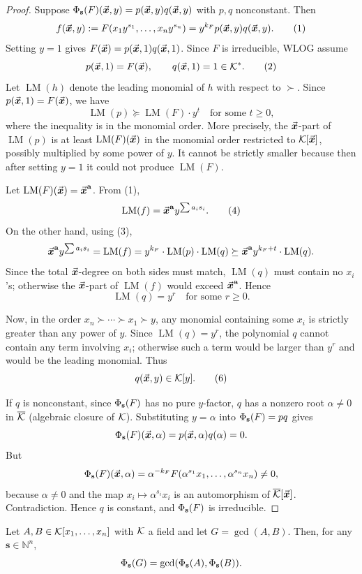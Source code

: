 \documentclass{article}
\numberwithin{equation}{section}
\begin{document}
\begin{proof}
Suppose $\Phi_{\mathbf{s}}(F)(\vec{\boldsymbol{x}},y)=p(\vec{\boldsymbol{x}},y)q(\vec{\boldsymbol{x}},y)$ with $p,q$ nonconstant. Then
\[
f(\vec{\boldsymbol{x}},y):=F(x_1y^{s_1},\dots,x_ny^{s_n})=y^{k_F}p(\vec{\boldsymbol{x}},y)q(\vec{\boldsymbol{x}},y). \tag{1}
\]
Setting $y=1$ gives $F(\vec{\boldsymbol{x}})=p(\vec{\boldsymbol{x}},1)q(\vec{\boldsymbol{x}},1)$. Since $F$ is irreducible, WLOG assume
\[
p(\vec{\boldsymbol{x}},1)=F(\vec{\boldsymbol{x}}), \qquad q(\vec{\boldsymbol{x}},1)=1\in{\mathcal{K}}^*. \tag{2}
\]
%
Let $\operatorname{LM}(h)$ denote the leading monomial of $h$ with respect to $\succ$.
%
Since $p(\vec{\boldsymbol{x}},1)=F(\vec{\boldsymbol{x}})$, we have
\[
\operatorname{LM}(p) \succeq \operatorname{LM}(F) \cdot y^t \quad \text{for some } t\ge 0, \tag{3}
\]
where the inequality is in the monomial order. More precisely, the $\vec{\boldsymbol{x}}$-part of $\operatorname{LM}(p)$ is at least $\operatorname{LM}(F)(\vec{\boldsymbol{x}})$ in the monomial order restricted to ${\mathcal{K}}[\vec{\boldsymbol{x}}]$, possibly multiplied by some power of $y$.  It cannot be strictly smaller because then after setting $y=1$ it could not produce $\operatorname{LM}(F)$.

Let $\operatorname{LM}(F)(\vec{\boldsymbol{x}})=\vec{\boldsymbol{x}}^{\mathbf{a}}$. From (1),
\[
\operatorname{LM}(f)=\vec{\boldsymbol{x}}^{\mathbf{a}} y^{\sum a_i s_i}. \tag{4}
\]
On the other hand, using (3),
\[
\vec{\boldsymbol{x}}^{\mathbf{a}} y^{\sum a_i s_i}=\operatorname{LM}(f)
= y^{k_F}\cdot \operatorname{LM}(p)\cdot \operatorname{LM}(q)
\succeq \vec{\boldsymbol{x}}^{\mathbf{a}} y^{k_F+t}\cdot \operatorname{LM}(q).
\]
Since the total $\vec{\boldsymbol{x}}$-degree on both sides must match, $\operatorname{LM}(q)$ must contain no $x_i$'s; otherwise the $\vec{\boldsymbol{x}}$-part of $\operatorname{LM}(f)$ would exceed $\vec{\boldsymbol{x}}^{\mathbf{a}}$. Hence
\[
\operatorname{LM}(q)=y^r \quad \text{for some } r\ge 0. \tag{5}
\]

Now, in the order $x_n \succ \cdots \succ x_1 \succ y$, any monomial containing some $x_i$ is strictly greater than any power of $y$. Since $\operatorname{LM}(q)=y^r$, the polynomial $q$ cannot contain any term involving $x_i$; otherwise such a term would be larger than $y^r$ and would be the leading monomial. Thus
\[
q(\vec{\boldsymbol{x}},y)\in{\mathcal{K}}[y]. \tag{6}
\]

If $q$ is nonconstant, since $\Phi_{\mathbf{s}}(F)$ has no pure $y$-factor, $q$ has a nonzero root $\alpha \neq 0$ in $\overline{{\mathcal{K}}}$ (algebraic closure of ${\mathcal{K}}$). Substituting $y=\alpha$ into $\Phi_{\mathbf{s}}(F)=pq$ gives
\[
\Phi_{\mathbf{s}}(F)(\vec{\boldsymbol{x}},\alpha)=p(\vec{\boldsymbol{x}},\alpha)q(\alpha)=0.
\]
But
\[
\Phi_{\mathbf{s}}(F)(\vec{\boldsymbol{x}},\alpha)=\alpha^{-k_F}F(\alpha^{s_1}x_1,\dots,\alpha^{s_n}x_n)\neq 0,
\]
because $\alpha\neq 0$ and the map $x_i\mapsto \alpha^{s_i}x_i$ is an automorphism of $\overline{{\mathcal{K}}}[\vec{\boldsymbol{x}}]$. Contradiction. Hence $q$ is constant, and $\Phi_{\mathbf{s}}(F)$ is irreducible.
\end{proof}

\begin{lemma}\label{lem:gcd-separation}
Let $A, B \in {\mathcal{K}}[x_1,\dots,x_n]$ with ${\mathcal{K}}$ a field and let $G = \gcd(A, B)$. Then, for any $\mathbf{s} \in \mathbb{N}^n$,
\[
\Phi_{\mathbf{s}}(G) =  \gcd(\Phi_{\mathbf{s}}(A), \Phi_{\mathbf{s}}(B)).
\]
\end{lemma}
\end{document}
